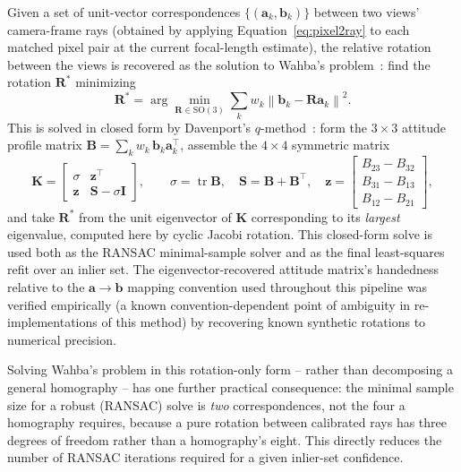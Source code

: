 \documentclass[11pt]{article}
\newcommand{\SO}{\mathrm{SO}(3)}
\newcommand{\vect}[1]{\mathbf{#1}}
\newcommand{\mat}[1]{\mathbf{#1}}
\begin{document}
Given a set of unit-vector correspondences $\{(\vect{a}_k, \vect{b}_k)\}$ between two views' camera-frame rays (obtained by applying Equation~\eqref{eq:pixel2ray} to each matched pixel pair at the current focal-length estimate), the relative rotation between the views is recovered as the solution to Wahba's problem~\cite{wahba1965least}: find the rotation $\mat{R}^*$ minimizing
\begin{equation}
\mat{R}^* = \arg\min_{\mat{R}\in\SO} \sum_k w_k \left\| \vect{b}_k - \mat{R}\vect{a}_k \right\|^2.
\label{eq:wahba}
\end{equation}
This is solved in closed form by Davenport's $q$-method~\cite{markley1988attitude}: form the $3\times3$ attitude profile matrix $\mat{B} = \sum_k w_k\, \vect{b}_k \vect{a}_k^{\!\top}$, assemble the $4\times4$ symmetric matrix
\begin{equation}
\mat{K} = \begin{bmatrix} \sigma & \vect{z}^{\!\top} \\ \vect{z} & \mat{S} - \sigma\mat{I} \end{bmatrix}, \qquad
\sigma = \operatorname{tr}\mat{B}, \quad \mat{S} = \mat{B}+\mat{B}^{\!\top}, \quad \vect{z} = \begin{bmatrix} B_{23}-B_{32} \\ B_{31}-B_{13} \\ B_{12}-B_{21} \end{bmatrix},
\label{eq:kmatrix}
\end{equation}
and take $\mat{R}^*$ from the unit eigenvector of $\mat{K}$ corresponding to its \emph{largest} eigenvalue, computed here by cyclic Jacobi rotation. This closed-form solve is used both as the RANSAC minimal-sample solver and as the final least-squares refit over an inlier set. The eigenvector-recovered attitude matrix's handedness relative to the $\vect{a}\to\vect{b}$ mapping convention used throughout this pipeline was verified empirically (a known convention-dependent point of ambiguity in re-implementations of this method) by recovering known synthetic rotations to numerical precision.

Solving Wahba's problem in this rotation-only form -- rather than decomposing a general homography -- has one further practical consequence: the minimal sample size for a robust (RANSAC) solve is \emph{two} correspondences, not the four a homography requires, because a pure rotation between calibrated rays has three degrees of freedom rather than a homography's eight. This directly reduces the number of RANSAC iterations required for a given inlier-set confidence.
\end{document}
